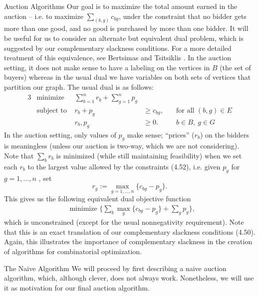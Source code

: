 \begin{section}{Auction Algorithms}
	Our goal is to maximize the total amount earned in the auction -- i.e. to 
	maximize $\sum_{(b,g)} c_{bg}$, under the constraint that no bidder gets more than one good, 
	and no good is purchased by more than one bidder.
	It will be useful for us to consider an alternate but equivalent dual problem, which is 
	suggested by our complementary slackness conditions. For a more detailed treatment of this 
	equivalence, see Bertsimas and Tsitsiklis \cite{bertsimas1997introduction}. 
	In the auction setting, it does not make 
	sense to have a labeling on the vertices in $B$ (the set of buyers) whereas in the usual dual we 
	have variables on both sets of vertices that partition our graph. The usual dual is as 
	follows:
	\begin{alignat}{3}
		& \text{minimize } & \sum_{b=1}^n r_b + \sum_{g=1}^n p_g & \\
		& \text{subject to } & r_b + p_g & \geq c_{bg}, &\quad \text{for all } (b,g)\in E\\
				     && r_b,p_g & \geq 0. & \quad b\in B,\ g\in G
	\end{alignat}
	In the auction setting, only 
	values of $p_g$ make sense; ``prices'' ($r_b$) on the bidders is meaningless (unless our 
	auction is two-way, which we are not considering). 
	Note that $\sum_b r_b$ is minimized (while still maintaining feasibility) when we set each 
	$r_b$ to the largest value allowed by the constraints (4.52), i.e. given $p_{g}$ for 
	$g=1, \dots, n$ , set
	\[
		r_{g} := \max_{g=1,\dots, n} \{c_{bg} - p_g\}.
	\]
	This gives us the following equivalent dual objective function 
	\begin{align}
		&\text{minimize }\{ \sum_b \max_g \{c_{bg} - p_g\} + \sum_g p_g\},
	\end{align}
	which is unconstrained (except for the usual nonnegativity requirement). 
	Note that this is an exact translation of our complementary slackness 
	conditions (4.50). Again, this illustrates the importance of complementary slackness in the 
	creation of algorithms for combinatorial optimization.

	\begin{subsection}{The Naive Algorithm}
		We will proceed by first describing a naive auction algorithm, which, although clever, 
		does not always work. Nonetheless, we will use it as motivation for 
		our final auction algorithm.


\end{subsection}
\end{section}
